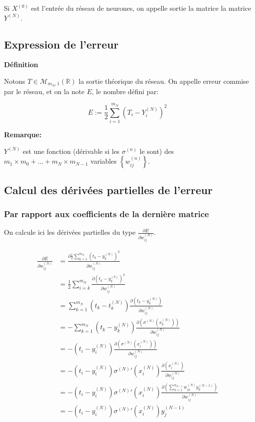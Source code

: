 \documentclass[11pt]{article}
\begin{document}
Si $X^{(0)}$ est l'entrée du réseau de neurones, on appelle sortie la matrice la
matrice $Y^{(N)}$.

\subsection{Expression de l'erreur}
\label{sec-5-2}

\textbf{Définition}

Notons $T\in\mathcal{M}_{m_{N},1}(\mathbb{R})$ la sortie théorique du réseau. On
appelle erreur commise par le réseau, et on la note $E$, le nombre défini par:

\begin{equation}
E:=\frac{1}{2}\sum_{i=1}^{m_{N}}(T_{i}-Y_{i}^{(N)})^{2}
\end{equation}

\textbf{Remarque:}

$Y^{(N)}$ est une fonction (dérivable si les $\sigma^{(n)}$ le sont) des
$m_{1}\times m_{0}+\dots+m_{N}\times m_{N-1}$ variables
$\left\{w_{ij}^{(n)}\right\}$.

\subsection{Calcul des dérivées partielles de l'erreur}
\label{sec-5-3}

\subsubsection{Par rapport aux coefficients de la dernière matrice}
\label{sec-5-3-1}

On calcule ici les dérivées partielles du type
$\frac{\partial E}{\partial w_{ij}^{(N)}}$.

\begin{align}
\frac{\partial E}{\partial w_{ij}^{(N)}}
& = \frac{\partial \frac{1}{2}\sum_{k=1}^{m_{N}}
(t_{k}-y_{k}^{(N)})^{2}}{\partial w_{ij}^{(N)}}\\
& = \frac{1}{2}\sum_{i=k}^{m_{N}}
\frac{\partial (t_{k}-y_{k}^{(k)})^{2}}{\partial w_{ij}^{(N)}}\\
& = \sum_{k=1}^{m_{N}}(t_{k}-t_{k}^{(N)})
\frac{\partial (t_{k}-y_{k}^{(N)})}{\partial w_{ij}^{(N)}}\\
& = -\sum_{k=1}^{m_{N}}(t_{k}-y_{k}^{(N)})
\frac{\partial (\sigma^{(N)}(x_{k}^{(N)}))}{\partial w_{ij}^{(N)}}\\
& = -(t_{i}-y_{i}^{(N)})
\frac{\partial (\sigma^{(N)}(x_{i}^{(N)}))}{\partial w_{ij}^{(N)}}\\
& = -(t_{i}-y_{i}^{(N)})\sigma^{(N)}'(x_{i}^{(N)})
\frac{\partial (x_{i}^{(N)})}{\partial w_{ij}^{(N)}}\\
& = -(t_{i}-y_{i}^{(N)})\sigma^{(N)}'(x_{i}^{(N)})
\frac{\partial (\sum_{k=1}^{n_{N-1}}w_{ik}^{(N)}y_{k}^{(N-1)})}
{\partial w_{ij}^{(N)}}\\
& = -(t_{i}-y_{i}^{(N)})\sigma^{(N)}'(x_{i}^{(N)})y_{j}^{(N-1)}\\
\end{align}
\end{document}
